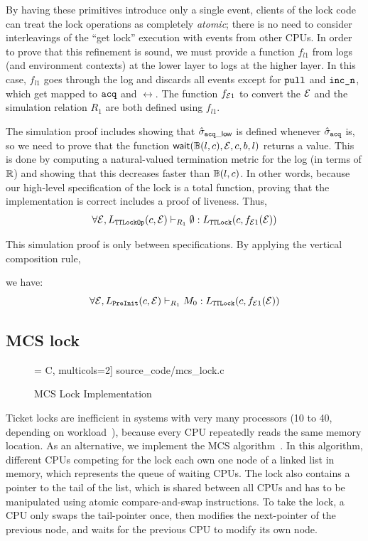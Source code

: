 {By having these primitives introduce only a single event, clients of the
lock code can treat the lock operations as completely \emph{atomic}; there is
no need to consider interleavings of the ``get lock'' execution
with events from other CPUs. In order to prove that this refinement
is sound, we must provide a function $f_{l1}$ from logs (and environment
contexts) at the lower layer to logs at the higher layer.  In this
case, $f_{l1}$ goes through the log and discards all events except for
${\texttt{pull}}$ and ${\texttt{inc\_n}}$, which get mapped to ${\texttt{acq}}$ and
$\rel$.
The function $f_{\mathcal{E}1}$ to convert the $\mathcal{E}$ 
and the simulation relation $R_1$ are both defined using $f_{l1}$.

The simulation proof
includes showing that $\hat{\sigma}_{{\texttt{acq}}\_\mathsf{low}}$ is defined whenever
$\hat{\sigma}_{{\texttt{acq}}}$ is, so we need to prove that the function
$\mathsf{wait}(\mathbb{B}(l, c), \mathcal{E}, c, b, l)$ returns a value. This is done
by computing a natural-valued termination metric for the log 
(in terms of
$\mathbb{R}$) and showing that this decreases faster than $\mathbb{B}(l,c)$. In other words,
because our high-level specification of the lock is a total function,
proving that the implementation is correct includes a proof of
liveness. Thus,
\[
\forall \mathcal{E}, 
L_{\texttt{TTLockOp}}(c, \mathcal{E}) \vdash_{R_1} \emptyset : L_{\texttt{TTLock}}(c,f_{\mathcal{E}1}(\mathcal{E}))
\]%

This simulation proof is only between specifications.
By applying the vertical composition rule,  we have:
\[
\forall \mathcal{E}, 
L_{\texttt{PreInit}}(c,\mathcal{E}) \vdash_{R_1} M_0 : L_{\texttt{TTLock}}(c, f_{\mathcal{E}1}(\mathcal{E}))
\]


\subsection{MCS lock}
\label{sec:con:mcs}
\begin{figure}
 = C, multicols=2] {source_code/mcs_lock.c}
\caption{MCS Lock Implementation}
\label{fig:exp:mcs_lock}
\hrulefill
\end{figure}

Ticket locks are inefficient in systems with very many processors (10
to 40, depending on workload~\cite{Boyd-wickizer12}), because every
CPU repeatedly reads the same memory location. As an alternative, we
implement the MCS algorithm~\cite{mcs91}. In this algorithm,
different CPUs competing for the lock each own one node of a
linked list in memory, which represents the queue of waiting CPUs. The
lock also contains a pointer to the tail of the list, which is shared
between all CPUs and has to be manipulated using atomic
compare-and-swap instructions. To take the lock, a CPU only
swaps the tail-pointer once, then modifies the next-pointer
of the previous node, and waits for the previous CPU to modify its own
node. 

}
